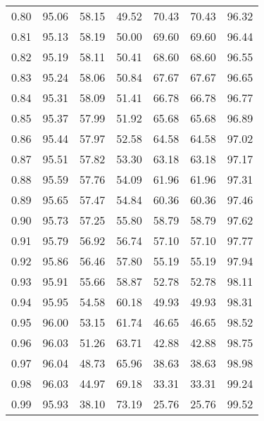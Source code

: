 \begin{tabular}{|c|c|c|c|c|c|c|}
      0.80 &     95.06 &     58.15 &      49.52 &   70.43 &      70.43 &         96.32 \\
      0.81 &     95.13 &     58.19 &      50.00 &   69.60 &      69.60 &         96.44 \\
      0.82 &     95.19 &     58.11 &      50.41 &   68.60 &      68.60 &         96.55 \\
      0.83 &     95.24 &     58.06 &      50.84 &   67.67 &      67.67 &         96.65 \\
      0.84 &     95.31 &     58.09 &      51.41 &   66.78 &      66.78 &         96.77 \\
      0.85 &     95.37 &     57.99 &      51.92 &   65.68 &      65.68 &         96.89 \\
      0.86 &     95.44 &     57.97 &      52.58 &   64.58 &      64.58 &         97.02 \\
      0.87 &     95.51 &     57.82 &      53.30 &   63.18 &      63.18 &         97.17 \\
      0.88 &     95.59 &     57.76 &      54.09 &   61.96 &      61.96 &         97.31 \\
      0.89 &     95.65 &     57.47 &      54.84 &   60.36 &      60.36 &         97.46 \\
      0.90 &     95.73 &     57.25 &      55.80 &   58.79 &      58.79 &         97.62 \\
      0.91 &     95.79 &     56.92 &      56.74 &   57.10 &      57.10 &         97.77 \\
      0.92 &     95.86 &     56.46 &      57.80 &   55.19 &      55.19 &         97.94 \\
      0.93 &     95.91 &     55.66 &      58.87 &   52.78 &      52.78 &         98.11 \\
      0.94 &     95.95 &     54.58 &      60.18 &   49.93 &      49.93 &         98.31 \\
      0.95 &     96.00 &     53.15 &      61.74 &   46.65 &      46.65 &         98.52 \\
      0.96 &     96.03 &     51.26 &      63.71 &   42.88 &      42.88 &         98.75 \\
      0.97 &     96.04 &     48.73 &      65.96 &   38.63 &      38.63 &         98.98 \\
      0.98 &     96.03 &     44.97 &      69.18 &   33.31 &      33.31 &         99.24 \\
      0.99 &     95.93 &     38.10 &      73.19 &   25.76 &      25.76 &         99.52 \\
\bottomrule
\end{tabular}
